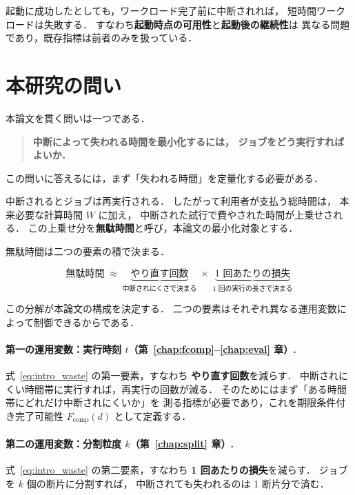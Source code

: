 \documentclass[11pt,a4paper]{ltjsreport}
\newcommand{\Fcomp}{F_{\mathrm{comp}}}
\begin{document}
起動に成功したとしても，ワークロード完了前に中断されれば，
短時間ワークロードは失敗する．
すなわち\textbf{起動時点の可用性}と\textbf{起動後の継続性}は
異なる問題であり，既存指標は前者のみを扱っている．

\section{本研究の問い}
\label{sec:question}

本論文を貫く問いは一つである．

\begin{quote}
\textbf{中断によって失われる時間を最小化するには，
ジョブをどう実行すればよいか．}
\end{quote}

この問いに答えるには，まず「失われる時間」を定量化する必要がある．

中断されるとジョブは再実行される．
したがって利用者が支払う総時間は，
本来必要な計算時間 $W$ に加え，
中断された試行で費やされた時間が上乗せされる．
この上乗せ分を\textbf{無駄時間}と呼び，本論文の最小化対象とする．

無駄時間は二つの要素の積で決まる．

\begin{equation}
\text{無駄時間} \;\approx\;
\underbrace{\text{やり直す回数}}_{\text{中断されにくさで決まる}}
\;\times\;
\underbrace{\text{1 回あたりの損失}}_{\text{1 回の実行の長さで決まる}}
\label{eq:intro_waste}
\end{equation}

この分解が本論文の構成を決定する．
二つの要素はそれぞれ異なる運用変数によって制御できるからである．

\paragraph{第一の運用変数：実行時刻 $t$（第~\ref{chap:fcomp}--\ref{chap:eval} 章）.}
式~\eqref{eq:intro_waste} の第一要素，すなわち
\textbf{やり直す回数}を減らす．
中断されにくい時間帯に実行すれば，再実行の回数が減る．
そのためにはまず「ある時間帯にどれだけ中断されにくいか」を
測る指標が必要であり，これを期限条件付き完了可能性
$\Fcomp(d)$ として定義する．

\paragraph{第二の運用変数：分割粒度 $k$（第~\ref{chap:split} 章）.}
式~\eqref{eq:intro_waste} の第二要素，すなわち
\textbf{1 回あたりの損失}を減らす．
ジョブを $k$ 個の断片に分割すれば，
中断されても失われるのは 1 断片分で済む．
\end{document}
